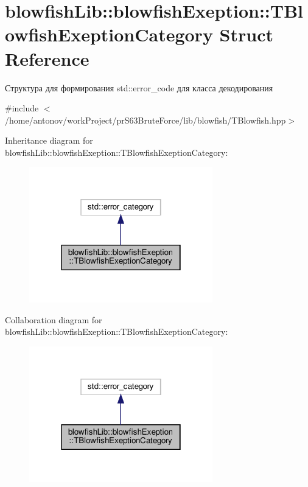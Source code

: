 \hypertarget{structblowfish_lib_1_1blowfish_exeption_1_1_t_blowfish_exeption_category}{}\section{blowfish\+Lib\+:\+:blowfish\+Exeption\+:\+:T\+Blowfish\+Exeption\+Category Struct Reference}
\label{structblowfish_lib_1_1blowfish_exeption_1_1_t_blowfish_exeption_category}


Структура для формирования std\+::error\+\_\+code для класса декодирования  




{\ttfamily \#include $<$/home/antonov/work\+Project/pr\+S63\+Brute\+Force/lib/blowfish/\+T\+Blowfish.\+hpp$>$}



Inheritance diagram for blowfish\+Lib\+:\+:blowfish\+Exeption\+:\+:T\+Blowfish\+Exeption\+Category\+:
\nopagebreak
\begin{figure}[H]
\begin{center}
\leavevmode
\includegraphics[width=226pt]{structblowfish_lib_1_1blowfish_exeption_1_1_t_blowfish_exeption_category__inherit__graph}
\end{center}
\end{figure}


Collaboration diagram for blowfish\+Lib\+:\+:blowfish\+Exeption\+:\+:T\+Blowfish\+Exeption\+Category\+:
\nopagebreak
\begin{figure}[H]
\begin{center}
\leavevmode
\includegraphics[width=226pt]{structblowfish_lib_1_1blowfish_exeption_1_1_t_blowfish_exeption_category__coll__graph}
\end{center}
\end{figure}
